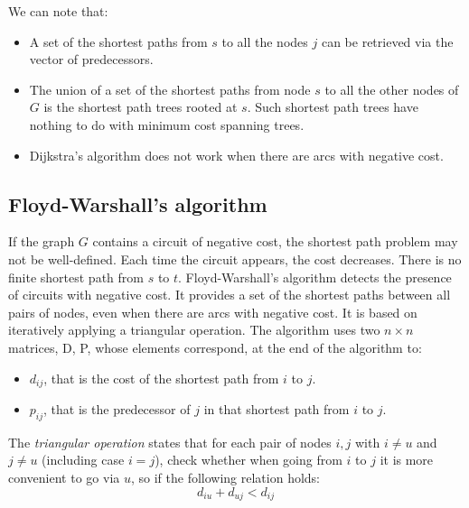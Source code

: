 \documentclass[12pt, a4paper]{report}
\newtheorem[style=M,bodystyle=\normalfont]{proposition}{Proposition}
\newtheorem[style=M,bodystyle=\normalfont]{theorem}{Theorem}
\newtheorem[style=M,bodystyle=\normalfont]{corollary}{Corollary}
\newtheorem[style=M,bodystyle=\normalfont]{lemma}{Lemma}
\newtheorem[style=M,bodystyle=\normalfont]{definition}{Definition}
\begin{document}
    We can note that: 
    \begin{itemize}
        \item A set of the shortest paths from $s$ to all the nodes $j$ can be retrieved via the vector of predecessors. 
        \item The union of a set of the shortest paths from node $s$ to all the other nodes of $G$ is the shortest path trees rooted at $s$. Such shortest path trees have 
            nothing to do with minimum cost spanning trees. 
        \item Dijkstra's algorithm does not work when there are arcs with negative cost. 
    \end{itemize}

    \subsection{Floyd-Warshall's algorithm}
    If the graph $G$ contains a circuit of negative cost, the shortest path problem may not be well-defined. Each time the circuit appears, the cost decreases. There is no 
    finite shortest path from $s$ to $t$. Floyd-Warshall's algorithm detects the presence of circuits with negative cost. It provides a set of the shortest paths between all pairs
    of nodes, even when there are arcs with negative cost. It is based on iteratively applying a triangular operation. 
    The algorithm uses two $n \times n$ matrices, D, P, whose elements correspond, at the end of the algorithm to: 
    \begin{itemize}
        \item $d_{ij}$, that is the cost of the shortest path from $i$ to $j$.
        \item $p_{ij}$, that is the predecessor of $j$ in that shortest path from $i$ to $j$.
    \end{itemize}
    \begin{definition}
        The \emph{triangular operation} states that for each pair of nodes $i,j$ with $i \neq u$ and $j \neq u$ (including case $i=j$), check whether when going from $i$ to $j$ it is 
        more convenient to go via $u$, so if the following relation holds: 
        \[d_{iu}+d_{uj} < d_{ij}\]
    \end{definition}
\end{document}
